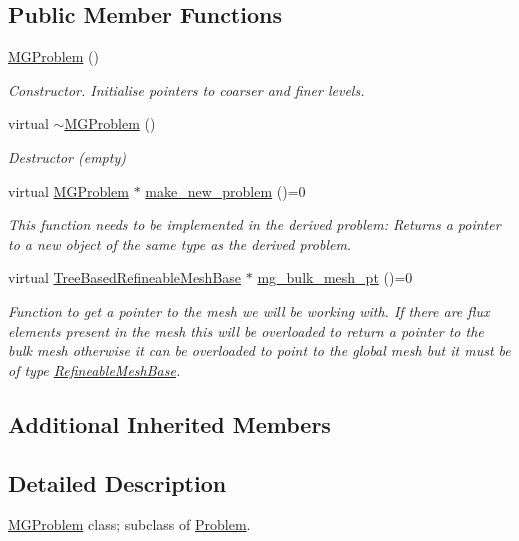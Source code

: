 \subsection*{Public Member Functions}
\begin{DoxyCompactItemize}
\item 
\hyperlink{classoomph_1_1MGProblem_a6e66372fd671f1229868616091fa25f4}{M\+G\+Problem} ()
\begin{DoxyCompactList}\small\item\em Constructor. Initialise pointers to coarser and finer levels. \end{DoxyCompactList}\item 
virtual \hyperlink{classoomph_1_1MGProblem_aefc32d5105fc72b8367891794d087a93}{$\sim$\+M\+G\+Problem} ()
\begin{DoxyCompactList}\small\item\em Destructor (empty) \end{DoxyCompactList}\item 
virtual \hyperlink{classoomph_1_1MGProblem}{M\+G\+Problem} $\ast$ \hyperlink{classoomph_1_1MGProblem_a8698cbc94e6cb46df5c2c189fab81196}{make\+\_\+new\+\_\+problem} ()=0
\begin{DoxyCompactList}\small\item\em This function needs to be implemented in the derived problem\+: Returns a pointer to a new object of the same type as the derived problem. \end{DoxyCompactList}\item 
virtual \hyperlink{classoomph_1_1TreeBasedRefineableMeshBase}{Tree\+Based\+Refineable\+Mesh\+Base} $\ast$ \hyperlink{classoomph_1_1MGProblem_a491bcf30805006f4b976de8ebaf5afd3}{mg\+\_\+bulk\+\_\+mesh\+\_\+pt} ()=0
\begin{DoxyCompactList}\small\item\em Function to get a pointer to the mesh we will be working with. If there are flux elements present in the mesh this will be overloaded to return a pointer to the bulk mesh otherwise it can be overloaded to point to the global mesh but it must be of type \hyperlink{classoomph_1_1RefineableMeshBase}{Refineable\+Mesh\+Base}. \end{DoxyCompactList}\end{DoxyCompactItemize}
\subsection*{Additional Inherited Members}


\subsection{Detailed Description}
\hyperlink{classoomph_1_1MGProblem}{M\+G\+Problem} class; subclass of \hyperlink{classoomph_1_1Problem}{Problem}. 

